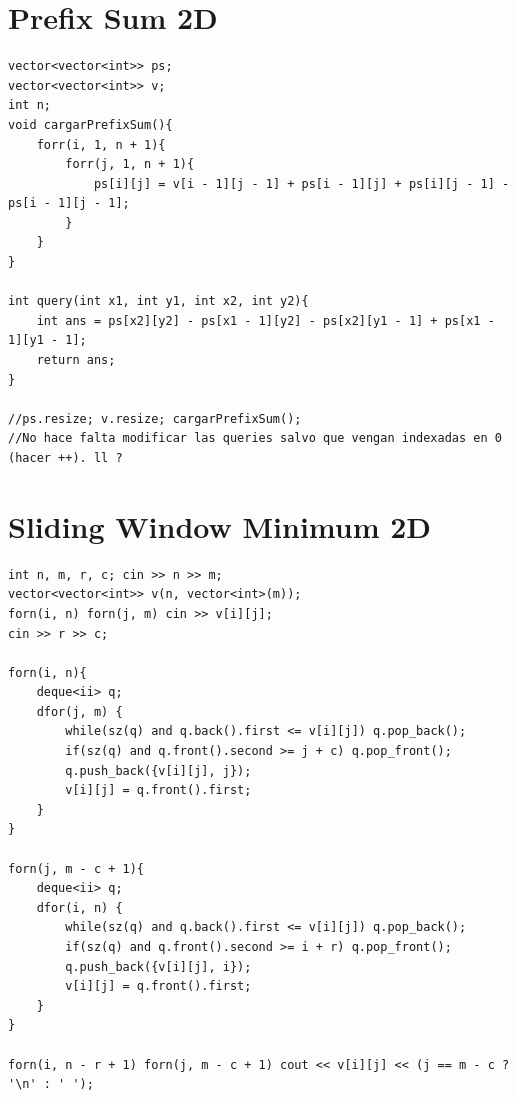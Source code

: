 \documentclass{article}
\begin{document}
\section{Prefix Sum 2D}
\begin{lstlisting}
vector<vector<int>> ps;
vector<vector<int>> v;
int n;
void cargarPrefixSum(){
    forr(i, 1, n + 1){
        forr(j, 1, n + 1){
            ps[i][j] = v[i - 1][j - 1] + ps[i - 1][j] + ps[i][j - 1] - ps[i - 1][j - 1];
        }
    }
}
 
int query(int x1, int y1, int x2, int y2){
    int ans = ps[x2][y2] - ps[x1 - 1][y2] - ps[x2][y1 - 1] + ps[x1 - 1][y1 - 1];
    return ans;
}

//ps.resize; v.resize; cargarPrefixSum();
//No hace falta modificar las queries salvo que vengan indexadas en 0 (hacer ++). ll ?
\end{lstlisting}

\section{Sliding Window Minimum 2D}
\begin{lstlisting}
int n, m, r, c; cin >> n >> m;
vector<vector<int>> v(n, vector<int>(m));
forn(i, n) forn(j, m) cin >> v[i][j];
cin >> r >> c;

forn(i, n){
    deque<ii> q;
    dfor(j, m) {
        while(sz(q) and q.back().first <= v[i][j]) q.pop_back();
        if(sz(q) and q.front().second >= j + c) q.pop_front();
        q.push_back({v[i][j], j});
        v[i][j] = q.front().first;
    }
}

forn(j, m - c + 1){
    deque<ii> q;
    dfor(i, n) {
        while(sz(q) and q.back().first <= v[i][j]) q.pop_back();
        if(sz(q) and q.front().second >= i + r) q.pop_front();
        q.push_back({v[i][j], i});
        v[i][j] = q.front().first; 
    }
}

forn(i, n - r + 1) forn(j, m - c + 1) cout << v[i][j] << (j == m - c ? '\n' : ' ');
\end{lstlisting}
\end{document}
